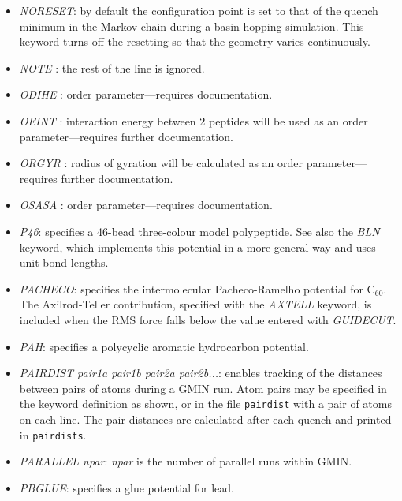 \documentclass[12pt,a4paper,dvips]{article}
\begin{document}
\begin{itemize}
\item {\it NORESET\/}: by default the configuration point is set to that of the
quench minimum in the Markov chain during a basin-hopping simulation. This
keyword turns off the resetting so that the geometry varies continuously.

\item {\it NOTE \/}: the rest of the line is ignored.

\item {\it ODIHE \/}: order parameter---requires documentation.

\item {\it OEINT \/}: interaction energy between 2 peptides will be used as an order parameter---requires 
further documentation.

\item {\it ORGYR \/}: radius of gyration will be calculated as an order parameter---requires 
further documentation.

\item {\it OSASA \/}: order parameter---requires documentation.

\item {\it P46\/}: specifies a 46-bead three-colour model polypeptide.
See also the {\it BLN} keyword, which implements this potential in a more
general way and uses unit bond lengths.

\item {\it PACHECO\/}: specifies the intermolecular Pacheco-Ramelho potential for C$_{60}$.
The Axilrod-Teller contribution, specified with the {\it AXTELL\/} keyword, is included
when the RMS force falls below the value entered with {\it GUIDECUT\/}.

\item{\it PAH}: specifies a polycyclic aromatic hydrocarbon potential.

\item{\it PAIRDIST pair1a pair1b pair2a pair2b...}: enables tracking of the distances between pairs of atoms during a GMIN run. Atom pairs may
be specified in the keyword definition as shown, or in the file {\tt pairdist} with a pair of atoms on each line. The pair distances are
calculated after each quench and printed in {\tt pairdists}.

\item {\it PARALLEL npar\/}: {\it npar\/} is the number of parallel runs within GMIN.

\item {\it PBGLUE\/}: specifies a glue potential for lead.


\end{itemize}
\end{document}
